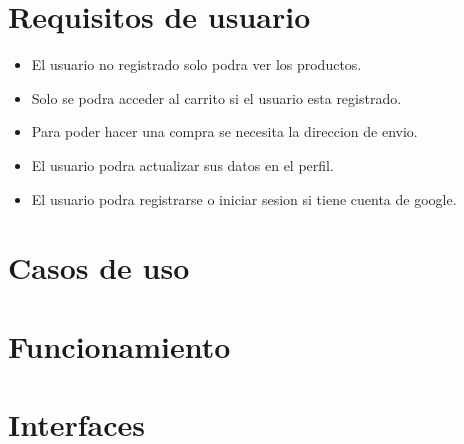 \documentclass{article}
\begin{document}
\section{Requisitos de usuario}
\begin{itemize}
    \item El usuario no registrado solo podra ver los productos.
    \item Solo se podra acceder al carrito si el usuario esta registrado.
    \item Para poder hacer una compra se necesita la direccion de envio.
    \item El usuario podra actualizar sus datos en el perfil.
    \item El usuario podra registrarse o iniciar sesion si tiene cuenta de google.
\end{itemize}

\section{Casos de uso}
\begin{center}
\end{center}
\section{Funcionamiento}
\section{Interfaces}
\end{document}

